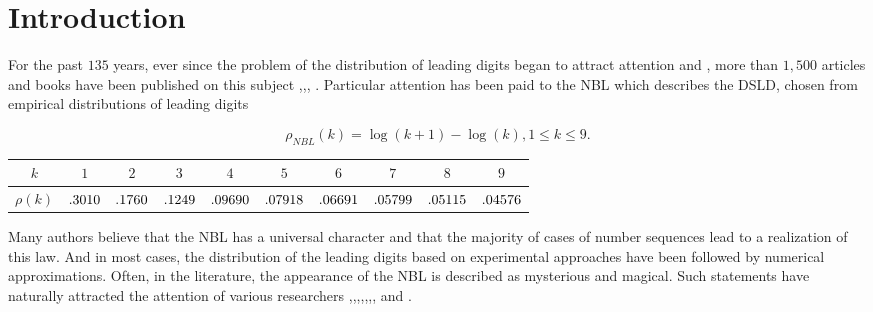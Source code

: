 \documentclass[titlepage,fleqn]{article}%
\begin{document}
\section{Introduction}%

\label{introduction}%
%

\graphicspath{{C:/Users/Vladimir/Documents/Data Mining/MITRE/graphics/}}%


For the past $135$ years, ever since the problem of the distribution of
leading digits began to attract attention
\cite{newcombs}  and \cite{benford}%
, more than $1,500$ articles and books have been published on this subject
\cite{hill},\cite{bergerhill},\cite{arnotheodore},\cite{miller}%
. Particular attention has been paid to the NBL which describes the DSLD,
chosen from empirical distributions of leading digits%

\begin{equation}
\rho_{NBL}(k)=\log(k+1)-\log(k),1\leq k\leq9. \label{BF_Distr}%
\end{equation}
\medskip%

\begin{tabular}
[c]{|c|c|c|c|c|c|c|c|c|c|}\hline\hline
$k$ & $1$ & $2$ & $3$ & $4$ & $5$ & $6$ & $7$ & $8$ & $9$\\\hline
$\rho(k)$ & ${\small .3010}$ & .${\small 1760}$ & ${\small .1249}$ &
${\small .09690}$ & ${\small .07918}$ & ${\small .06691}$ & ${\small .05799}$
& ${\small .05115}$ & ${\small .04576}$\\\hline\hline
\end{tabular}
\bigskip

Many authors believe that the NBL has a universal character and that the
majority of cases of number sequences lead to a realization of this law. And
in most cases, the distribution of the leading digits based on experimental
approaches have been followed by numerical approximations. Often, in the
literature, the appearance of the NBL is described as mysterious and magical.
Such statements have naturally attracted the attention of various researchers
\cite{diaconis},\cite{raimi},\cite{nigrini1},\cite{arnold0},\cite
{arnold1},\cite{bergerhill},\cite{nigrini},\cite{arnotheodore} and \cite
{miller}%
.
\end{document}
